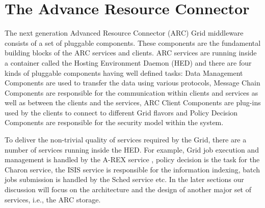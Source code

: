 \documentclass[final]{ieee}
\begin{document}







\section{The Advance Resource Connector}
\label{The Advance Resource Connector}

The next generation Advanced Resource Connector (ARC) Grid middleware \cite{NorduGridsite} \cite{KnowARCsite} consists of a set of pluggable components. These components are the
fundamental building blocks of the ARC services and clients. ARC
services are running inside a container called the Hosting Environment
Daemon (HED) and there are four kinds of pluggable components having well
defined tasks: Data Management Components are used to transfer the
data using various protocols, Message Chain Components are
responsible for the communication within clients and services as well as
between the clients and the services, ARC Client Components are
plug-ins used by the clients to connect to different Grid flavors and
Policy Decision Components are responsible for the security model
within the system.

To deliver the non-trivial quality of services required by the Grid,
there are a number of services running inside the HED. For example, Grid
job execution and management is handled by the A-REX service \cite{AREXdesigndoc}, policy
decision is the task for the Charon service, the ISIS service is
responsible for the information indexing, batch jobs submission is
handled by the Sched service etc. In the later sections our discussion
will focus on the architecture and the design of another major set
of services, i.e., the ARC storage. 
\end{document}
